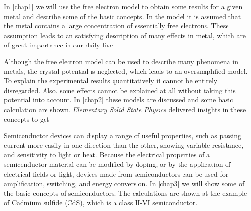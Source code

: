 In \ref{chap1}  we will use the free electron model to obtain some results for a given metal and describe some of the basic concepts. In the model it is assumed that the metal contains a large concentration of essentially free electrons. These assumption leads to an satisfying description of many effects in metal, which are of great importance in our daily live.

Although the free electron model can be used to describe many phenomena in metals, the crystal
potential is neglected, which leads to an oversimplified model. To explain the experimental results quantitatively it cannot be entirely disregarded. Also, some effects cannot be explained at all without taking this potential into account. In \ref{chap2}  these models are discussed and some basic calculation are shown. \textit{Elementary Solid State Physics} \cite{elementary_SSP} delivered insights in these concepts to get 

Semiconductor devices can display a range of useful properties, such as passing current more easily in one direction than the other, showing variable resistance, and sensitivity to light or heat. Because the electrical properties of a semiconductor material can be modified by doping, or by the application of electrical fields or light, devices made from semiconductors can be used for amplification, switching, and energy conversion. In \ref{chap3}  we will show some of the basic concepts of semiconductors. The calculations are shown at the example of Cadmium sulfide (CdS), which is a class II-VI semiconductor.  

